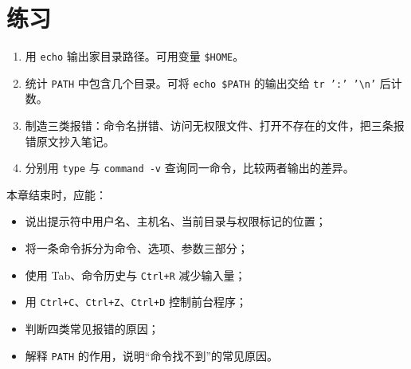 \section{练习}

\begin{enumerate}
  \item 用 \texttt{echo} 输出家目录路径。可用变量 \texttt{\$HOME}。
  \item 统计 \texttt{PATH} 中包含几个目录。可将 \texttt{echo \$PATH} 的输出交给 \texttt{tr ':' '\textbackslash n'} 后计数。
  \item 制造三类报错：命令名拼错、访问无权限文件、打开不存在的文件，把三条报错原文抄入笔记。
  \item 分别用 \texttt{type} 与 \texttt{command -v} 查询同一命令，比较两者输出的差异。
\end{enumerate}

\begin{checkpoint}
本章结束时，应能：
\begin{itemize}
  \item 说出提示符中用户名、主机名、当前目录与权限标记的位置；
  \item 将一条命令拆分为命令、选项、参数三部分；
  \item 使用 Tab、命令历史与 \texttt{Ctrl+R} 减少输入量；
  \item 用 \texttt{Ctrl+C}、\texttt{Ctrl+Z}、\texttt{Ctrl+D} 控制前台程序；
  \item 判断四类常见报错的原因；
  \item 解释 \texttt{PATH} 的作用，说明“命令找不到”的常见原因。
\end{itemize}
\end{checkpoint}
